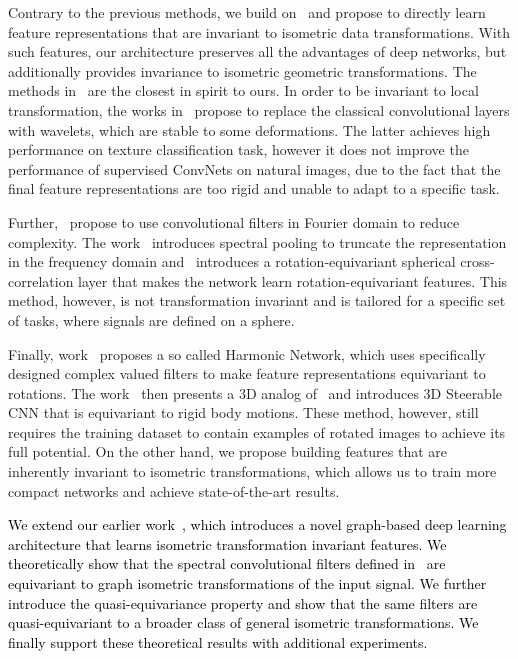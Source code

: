 \documentclass[10pt,journal,compsoc]{IEEEtran}
\newcommand{\renata}[1]{\textcolor{black}{#1}}
\begin{document}
	Contrary to the previous methods, we build on~\cite{bb:KhasanovaF17} and propose to directly learn feature representations that are invariant to isometric data transformations. With such features, our architecture preserves all the advantages of deep networks, but additionally provides invariance to isometric geometric transformations. The methods in~\cite{bb:oyallon2015deep, bb:bruna2013invariant, bb:harm} are the closest in spirit to ours. In order to be invariant to local transformation, the works in~\cite{bb:oyallon2015deep, bb:bruna2013invariant} propose to replace the classical convolutional layers with wavelets, which are stable to some deformations. The latter achieves high performance on texture classification task, however it does not improve the performance of supervised ConvNets on natural images, due to the fact that the final feature representations are too rigid and unable to adapt to a specific task.

	Further,~\cite{bb:rev1, bb:Cohen2018, bb:rev2} propose to use convolutional filters in Fourier domain to reduce complexity. The work~\cite{bb:rev2} introduces spectral pooling to truncate the representation in the frequency domain and~\cite{bb:Cohen2018} introduces a rotation-equivariant spherical cross-correlation layer that makes the network learn rotation-equivariant features. This method, however, is not transformation invariant and is tailored for a specific set of tasks, where signals are defined on a sphere.

	Finally, work~\cite{bb:harm} proposes a so called Harmonic Network, which uses specifically designed complex valued filters to make feature representations equivariant to rotations. The work~\cite{bb:3dSteerableWeiler} then presents a 3D analog of~\cite{bb:harm}  and introduces 3D Steerable CNN that is equivariant to rigid body motions. These method, however, still requires the training dataset to contain examples of rotated images to achieve its full potential. On the other hand, we propose building features that are inherently invariant to isometric transformations, which allows us to train more compact networks and achieve state-of-the-art results.

	\renata{We extend our earlier work~\cite{bb:KhasanovaF17}, which introduces a novel graph-based deep learning architecture that learns isometric transformation invariant features. We theoretically show that the spectral convolutional filters defined in~\cite{bb:KhasanovaF17} are equivariant to graph isometric transformations of the input signal. We further introduce the quasi-equivariance property and show that the same filters are quasi-equivariant to a broader class of general isometric transformations. We finally support these theoretical results with additional experiments.}
\end{document}
